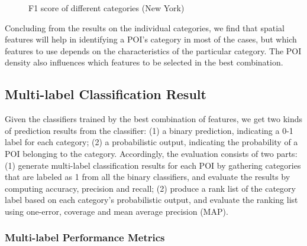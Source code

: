 \begin{figure}[ht]
\centering
\caption{F1 score of different categories (New York)}
\label{fig:NewYorkF1}       %
\end{figure}

Concluding from the results on the individual categories,
we find that spatial features will help in identifying a POI's category in most of the cases,
but which features to use depends on the characteristics of the particular category.
The POI density also influences which features to be selected in the best combination.

\subsection{Multi-label Classification Result}

Given the classifiers trained by the best combination of features, we
get two kinds of prediction results from the classifier: (1) a binary prediction,
indicating a 0-1 label for each category; (2) a probabilistic output,
indicating the probability of a POI belonging to the category. 
Accordingly, the evaluation consists of two parts:
(1) generate multi-label classification results for each POI by
gathering categories that are labeled as 1 from all the binary classifiers,
and evaluate the results by computing accuracy, precision
and recall; (2) produce a rank list of the category label based on
each category's probabilistic output, and evaluate the ranking list
using one-error, coverage and mean average precision (MAP).

\subsubsection{ Multi-label Performance Metrics}
